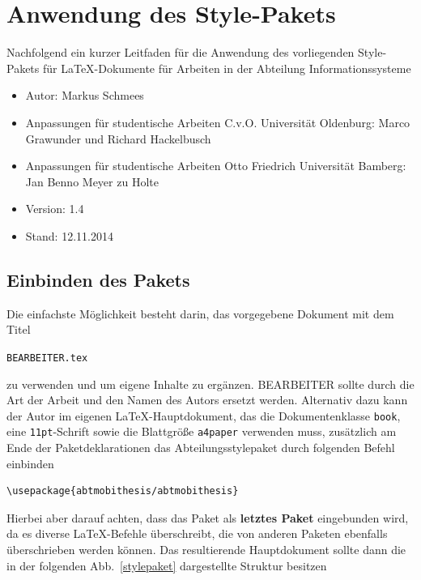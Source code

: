 \chapter{Anwendung des Style-Pakets} 
Nachfolgend ein kurzer Leitfaden f\"{u}r die Anwendung des
vorliegenden Style-Pakets f\"{u}r LaTeX-Dokumente f\"{u}r Arbeiten in der
Abteilung Informationssysteme

\begin{itemize}
\item Autor: Markus Schmees
\item Anpassungen f\"{u}r studentische Arbeiten C.v.O. Universit\"{a}t Oldenburg: Marco Grawunder und Richard Hackelbusch
\item Anpassungen f\"{u}r studentische Arbeiten Otto Friedrich Universit\"{a}t Bamberg: Jan Benno Meyer zu Holte
\item Version: 1.4
\item Stand: 12.11.2014
\end{itemize}

\section{Einbinden des Pakets}
Die einfachste M\"{o}glichkeit besteht darin, das vorgegebene Dokument
mit dem Titel

\texttt{BEARBEITER.tex}

zu verwenden und um eigene
Inhalte zu erg\"{a}nzen. BEARBEITER sollte durch die Art der Arbeit und den Namen des Autors ersetzt werden. Alternativ dazu kann der Autor im eigenen
\LaTeX-Hauptdokument, das die Dokumentenklasse \texttt{book}, eine
\texttt{11pt}-Schrift sowie die Blattgr\"{o}{\ss}e \texttt{a4paper}
verwenden muss, zus\"{a}tzlich am Ende der Paketdeklarationen das
Abteilungsstylepaket durch folgenden Befehl einbinden

\begin{verbatim}
\usepackage{abtmobithesis/abtmobithesis}
\end{verbatim}

Hierbei aber darauf achten, dass das Paket als \textbf{letztes
Paket} eingebunden wird, da es diverse \LaTeX-Befehle
\"{u}berschreibt, die von anderen Paketen ebenfalls \"{u}berschrieben
werden k\"{o}nnen. Das resultierende Hauptdokument sollte dann die in
der folgenden Abb.~\ref{stylepaket} dargestellte Struktur besitzen

